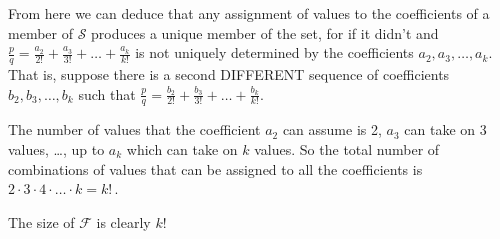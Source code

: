 \documentclass{article}
\begin{document}
From here we can deduce that any assignment
of values to the coefficients of a member of $\mathcal{S}$ produces a unique member
of the set, for if it didn't and
$\frac{p}{q} = \frac{a_2}{2!} + \frac{a_3}{3!} + \dots{} + \frac{a_k}{k!}$ is not uniquely 
determined by the coefficients
$a_2, a_3, \dots{}, a_k$. That is, suppose there is a second DIFFERENT sequence of coefficients
$b_2, b_3, \dots{}, b_k$ such that
$\frac{p}{q} = \frac{b_2}{2!} + \frac{b_3}{3!} + \dots{} + \frac{b_k}{k!}$.

The number of values that the coefficient $a_2$ can assume is 2, $a_3$ can take on 3 values, \dots{},
up to $a_k$ which can take on $k$ values. So the total number of combinations of values
that can be assigned to all the coefficients is $2\cdot{}3\cdot{}4\cdot\dots{}\cdot{}k = k!\,$.



The size of $\mathcal{F}$ is clearly $k!$
\end{document}
